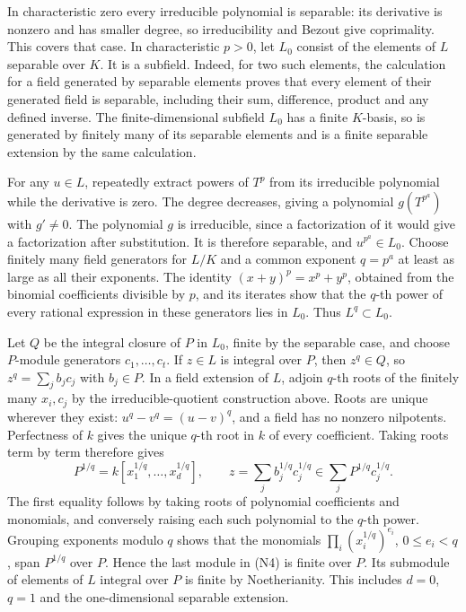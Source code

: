 \documentclass[11pt,a4paper,openany]{report}
\begin{document}
In characteristic zero every irreducible polynomial is separable: its derivative is nonzero and has smaller degree, so irreducibility and Bezout give coprimality. This covers that case. In characteristic \(p>0\), let \(L_0\) consist of the elements of \(L\) separable over \(K\). It is a subfield. Indeed, for two such elements, the calculation for a field generated by separable elements proves that every element of their generated field is separable, including their sum, difference, product and any defined inverse. The finite-dimensional subfield \(L_0\) has a finite \(K\)-basis, so is generated by finitely many of its separable elements and is a finite separable extension by the same calculation.

For any \(u\in L\), repeatedly extract powers of \(T^p\) from its irreducible polynomial while the derivative is zero. The degree decreases, giving a polynomial \(g(T^{p^a})\) with \(g'\ne0\). The polynomial \(g\) is irreducible, since a factorization of it would give a factorization after substitution. It is therefore separable, and \(u^{p^a}\in L_0\). Choose finitely many field generators for \(L/K\) and a common exponent \(q=p^a\) at least as large as all their exponents. The identity \((x+y)^p=x^p+y^p\), obtained from the binomial coefficients divisible by \(p\), and its iterates show that the \(q\)-th power of every rational expression in these generators lies in \(L_0\). Thus \(L^q\subset L_0\).

Let \(Q\) be the integral closure of \(P\) in \(L_0\), finite by the separable case, and choose \(P\)-module generators \(c_1,\ldots,c_t\). If \(z\in L\) is integral over \(P\), then \(z^q\in Q\), so \(z^q=\sum_j b_jc_j\) with \(b_j\in P\). In a field extension of \(L\), adjoin \(q\)-th roots of the finitely many \(x_i,c_j\) by the irreducible-quotient construction above. Roots are unique wherever they exist: \(u^q-v^q=(u-v)^q\), and a field has no nonzero nilpotents. Perfectness of \(k\) gives the unique \(q\)-th root in \(k\) of every coefficient. Taking roots term by term therefore gives \[
P^{1/q}=k[x_1^{1/q},\ldots,x_d^{1/q}],\qquad
z=\sum_j b_j^{1/q}c_j^{1/q}
   \in\sum_j P^{1/q}c_j^{1/q}. \tag{N4}
\] The first equality follows by taking roots of polynomial coefficients and monomials, and conversely raising each such polynomial to the \(q\)-th power. Grouping exponents modulo \(q\) shows that the monomials \(\prod_i(x_i^{1/q})^{e_i}\), \(0\leq e_i<q\), span \(P^{1/q}\) over \(P\). Hence the last module in (N4) is finite over \(P\). Its submodule of elements of \(L\) integral over \(P\) is finite by Noetherianity. This includes \(d=0\), \(q=1\) and the one-dimensional separable extension.
\end{document}
